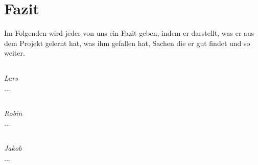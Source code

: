 \documentclass[12pt,a4paper,bibliography=totocnumbered,listof=totocnumbered]{scrartcl}
\begin{document}
\section{Fazit}
\label{sec:Fazit}
Im Folgenden wird jeder von uns ein Fazit geben, indem er darstellt, was er aus dem Projekt gelernt hat, was ihm gefallen hat, Sachen die er gut findet und so weiter.

\subsection{}
\emph{Lars}\\
...

\subsection{}
\emph{Robin}\\
...

\subsection{}
\emph{Jakob}\\
...

\pagebreak

\end{document}
